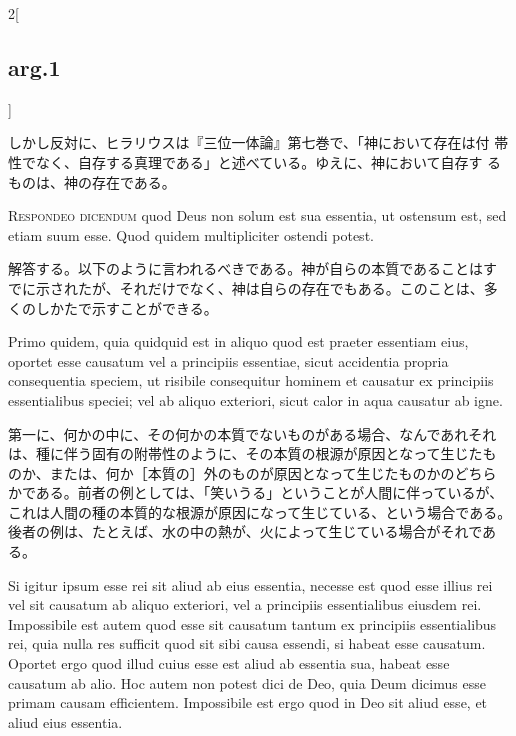 \documentclass[paper=a4paper,fontsize=10pt,jafontsize=9pt,titlepage]{jlreq}
\begin{document}
\begin{paracol}{2}[\subsection{arg.1}]
\switchcolumn

しかし反対に、ヒラリウスは『三位一体論』第七巻で、「神において存在は付
帯性でなく、自存する真理である」と述べている。ゆえに、神において自存す
るものは、神の存在である。


\textsc{Respondeo dicendum} quod Deus non solum est sua essentia, ut
ostensum est, sed etiam suum esse.  Quod quidem multipliciter ostendi
potest.

\switchcolumn

解答する。以下のように言われるべきである。神が自らの本質であることはす
でに示されたが、それだけでなく、神は自らの存在でもある。このことは、多
くのしかたで示すことができる。

\switchcolumn*

Primo quidem, quia quidquid est in aliquo quod est praeter essentiam
eius, oportet esse causatum vel a principiis essentiae, sicut
accidentia propria consequentia speciem, ut risibile consequitur
hominem et causatur ex principiis essentialibus speciei; vel ab aliquo
exteriori, sicut calor in aqua causatur ab igne.

\switchcolumn

第一に、何かの中に、その何かの本質でないものがある場合、なんであれそれ
は、種に伴う固有の附帯性のように、その本質の根源が原因となって生じたも
のか、または、何か［本質の］外のものが原因となって生じたものかのどちら
かである。前者の例としては、「笑いうる」ということが人間に伴っているが、
これは人間の種の本質的な根源が原因になって生じている、という場合である。
後者の例は、たとえば、水の中の熱が、火によって生じている場合がそれであ
る。

\switchcolumn*

Si igitur ipsum esse rei sit aliud ab eius essentia, necesse est quod
esse illius rei vel sit causatum ab aliquo exteriori, vel a principiis
essentialibus eiusdem rei.  Impossibile est autem quod esse sit
causatum tantum ex principiis essentialibus rei, quia nulla res
sufficit quod sit sibi causa essendi, si habeat esse causatum.
Oportet ergo quod illud cuius esse est aliud ab essentia sua, habeat
esse causatum ab alio.  Hoc autem non potest dici de Deo, quia Deum
dicimus esse primam causam efficientem.  Impossibile est ergo quod in
Deo sit aliud esse, et aliud eius essentia.

\switchcolumn


\end{paracol}
\end{document}
